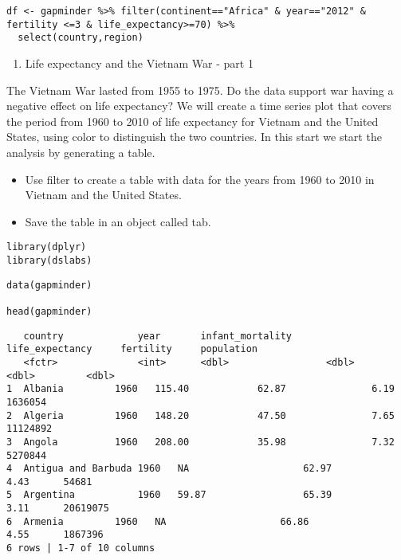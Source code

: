 \documentclass[]{article}
\providecommand{\tightlist}{%
  \setlength{\itemsep}{0pt}\setlength{\parskip}{0pt}}
\begin{document}
\begin{verbatim}
df <- gapminder %>% filter(continent=="Africa" & year=="2012" & fertility <=3 & life_expectancy>=70) %>%
  select(country,region)
\end{verbatim}

\begin{enumerate}
\def\labelenumi{\arabic{enumi}.}
\setcounter{enumi}{3}
\tightlist
\item
  Life expectancy and the Vietnam War - part 1
\end{enumerate}

The Vietnam War lasted from 1955 to 1975. Do the data support war having
a negative effect on life expectancy? We will create a time series plot
that covers the period from 1960 to 2010 of life expectancy for Vietnam
and the United States, using color to distinguish the two countries. In
this start we start the analysis by generating a table.

\begin{itemize}
\tightlist
\item
  Use filter to create a table with data for the years from 1960 to 2010
  in Vietnam and the United States.
\item
  Save the table in an object called tab.
\end{itemize}

\begin{verbatim}
library(dplyr)
library(dslabs)
\end{verbatim}

\begin{verbatim}
data(gapminder)

head(gapminder)
\end{verbatim}

\begin{verbatim}
   country             year       infant_mortality      life_expectancy     fertility     population
   <fctr>              <int>      <dbl>                 <dbl>               <dbl>         <dbl>
1  Albania         1960   115.40            62.87               6.19      1636054   
2  Algeria         1960   148.20            47.50               7.65      11124892  
3  Angola          1960   208.00            35.98               7.32      5270844   
4  Antigua and Barbuda 1960   NA                    62.97               4.43      54681 
5  Argentina           1960   59.87                 65.39               3.11      20619075  
6  Armenia         1960   NA                    66.86               4.55      1867396   
6 rows | 1-7 of 10 columns
\end{verbatim}
\end{document}
